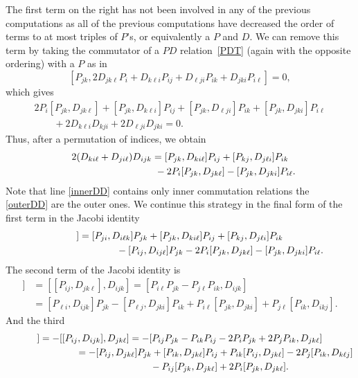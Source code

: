 \documentclass[10pt,a4paper]{amsart}
\numberwithin{equation}{section}
\begin{document}
 The first term on the right has not been involved in any of the previous computations as all of the previous computations have decreased the order of terms to at most triples of $P$'s, or equivalently a $P$ and $D$. We can remove this term by taking the commutator of a $PD$ relation~\eqref{PDT} (again with the opposite ordering) with a $P$ as in
 \[
   [P_{jk}, 2D_{jk\ell}P_i + D_{k\ell i}P_{ij}+ D_{ \ell ji}P_{ik}+D_{jki}P_{i\ell}]=0,
 \]
 which gives
 \begin{gather*}
  2P_i [P_{jk}, D_{jk\ell}] + [P_{jk}, D_{ k\ell i} ] P_{ij}+ [P_{jk}, D_{\ell j i}] P_{ik}+ [P_{jk}, D_{jki}]P_{i\ell} \\
  \qquad {}+ 2 D_{k\ell i}D_{kji}+2 D_{\ell j i}D_{jki}=0.
 \end{gather*}
 Thus, after a permutation of indices, we obtain
 \begin{gather}
   2(D_{ki\ell}+D_{ji\ell})D_{ijk} =
   [P_{jk}, D_{ki\ell}]P_{ij}+ [P_{kj}, D_{j\ell i}] P_{ik}\label{outerDD}\\
\hphantom{2(D_{ki\ell}+D_{ji\ell})D_{ijk} =}{} -2P_i [P_{jk},D_{jk\ell}]- [P_{jk}, D_{j k i}] P_{i\ell}.\label{innerDD}
 \end{gather}
 Note that line \eqref{innerDD} contains only inner commutation relations the \eqref{outerDD} are the outer ones. We continue this strategy in the final form of the first term in the Jacobi identity
\begin{gather*}%
 [ P_{i j}, [ D_{ ijk}, D_{jkl}]] =  [P_{ji}, D_{i\ell k}]P_{jk}+[P_{jk}, D_{ki\ell}]P_{ij}+ [P_{kj}, D_{j\ell i}]P_{ik}  \\
\hphantom{[ P_{i j}, [ D_{ ijk}, D_{jkl}]] =}{} - [P_{ij}, D_{ij\ell}] P_{jk}-2P_i [P_{jk},D_{jk\ell}]- [P_{jk}, D_{jk i}]P_{i\ell}.
 \end{gather*}
 The second term of the Jacobi identity is
\begin{align*}
 [ D_{ ijk}, [D_{jk\ell}, P_{i j}]] &=  [[P_{i j},D_{jk\ell} ], D_{ijk}] = [P_{ i \ell}P_{jk}-P_{j\ell}P_{ik}, D_{ijk}]  \\
& =[ P_{\ell i}, D_{i jk}] P_{jk}-[P_{\ell j}, D_{jki}]P_{ik}
 + P_{i \ell}[P_{jk}, D_{jki}]+P_{j\ell} [P_{ik}, D_{ikj}].
 \end{align*}
 And the third
\begin{gather*}
 [ D_{jk\ell}, [P_{i j},D_{ ijk}]] =  -[[P_{i j},D_{ijk} ], D_{jk\ell}]
 = - [P_{ij}P_{jk}-P_{ik}P_{ij} -2P_iP_{jk}+2P_jP_{ik}, D_{jk\ell}]\nonumber\\
\hphantom{[ D_{jk\ell}, [P_{i j},D_{ ijk}]]}{} =  -[P_{ij}, D_{jk\ell}]P_{jk} +[P_{ik}, D_{jk\ell}]P_{ij} + P_{ik}[ P_{ij}, D_{jk\ell}] -2P_j [ P_{ik}, D_{k\ell j}]\nonumber\\
\hphantom{[ D_{jk\ell}, [P_{i j},D_{ ijk}]]=}{}- P_{ij}[P_{jk}, D_{jk\ell}]+2P_i [ P_{jk}, D_{jk\ell}].
 \end{gather*}
\end{document}

